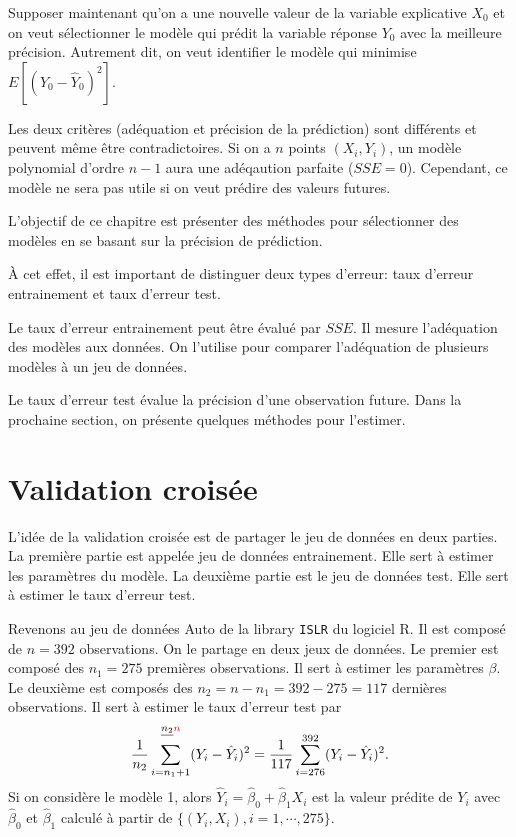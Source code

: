 \documentclass[11pt]{article}
\begin{document}
\noindent  Supposer maintenant qu'on a une nouvelle valeur de la variable explicative $X_0$ et on veut s\'electionner le mod\`ele qui pr\'edit la variable r\'eponse $Y_0$ avec la meilleure pr\'ecision. Autrement dit, on veut identifier le mod\`ele qui minimise $E[(Y_0-\hat Y_0)^2]$. 

\noindent Les deux crit\`eres (ad\'equation et pr\'ecision de la pr\'ediction) sont diff\'erents et peuvent m\^eme \^etre contradictoires. Si on a $n$ points $(X_i,Y_i)$, un mod\`ele polynomial d'ordre $n-1$ aura une ad\'eqaution parfaite ($SSE=0$). Cependant, ce mod\`ele ne sera pas utile si on veut pr\'edire des valeurs futures.

\noindent L'objectif de ce chapitre est pr\'esenter des m\'ethodes pour s\'electionner des mod\`eles en se basant sur la pr\'ecision de pr\'ediction. 

\noindent \`A cet effet, il est important de distinguer deux types d'erreur: taux d'erreur entrainement et taux d'erreur test.

\noindent Le taux d'erreur entrainement peut \^etre \'evalu\'e par $SSE$. Il mesure l'ad\'equation des mod\`eles aux donn\'ees. On l'utilise pour comparer l'ad\'equation de plusieurs mod\`eles \`a un jeu de donn\'ees.

\noindent Le taux d'erreur test \'evalue la pr\'ecision d'une observation future. Dans la prochaine section, on pr\'esente quelques m\'ethodes pour l'estimer.

\section{Validation crois\'ee}

\noindent L'id\'ee de la validation crois\'ee est de partager le jeu de donn\'ees en deux parties. La premi\`ere partie est appel\'ee jeu de donn\'ees entrainement. Elle sert \`a estimer les param\`etres du mod\`ele. La deuxi\`eme partie est le jeu de donn\'ees test. Elle sert \`a estimer le taux d'erreur test.

\noindent Revenons au jeu de donn\'ees \textsf{Auto} de la library \texttt{ISLR} du logiciel \textrm{R}. Il est compos\'e de $n=392$ observations. On le partage en deux jeux de donn\'ees. Le premier est compos\'e des $n_1=275$ premi\`eres observations. Il sert \`a estimer les param\`etres $\beta$. Le deuxi\`eme est compos\'es des $n_2=n-n_1=392-275=117$ derni\`eres observations. Il sert \`a estimer le taux d'erreur test par $$\frac{1}{n_2}\sum\limits_{i=n_1+1}^{\sout{n_2}\textcolor{red}{n}} (Y_i-\hat Y_i)^2=\frac{1}{117} \sum\limits_{i=276}^{392} (Y_i-\hat Y_i)^2.$$ 
\noindent Si on consid\`ere le mod\`ele 1, alors $\hat Y_i=\hat\beta_0+\hat\beta_1 X_{i}$ est la valeur pr\'edite de $Y_i$ avec $\hat\beta_0$ et $\hat\beta_1$ calcul\'e \`a partir de $\{(Y_i,X_{i}), i=1,\cdots,275\}$.
\end{document}
